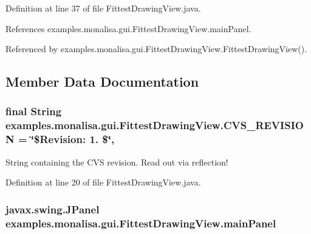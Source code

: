 Definition at line 37 of file Fittest\-Drawing\-View.\-java.



References examples.\-monalisa.\-gui.\-Fittest\-Drawing\-View.\-main\-Panel.



Referenced by examples.\-monalisa.\-gui.\-Fittest\-Drawing\-View.\-Fittest\-Drawing\-View().



\subsection{Member Data Documentation}
\hypertarget{classexamples_1_1monalisa_1_1gui_1_1_fittest_drawing_view_a9478a66d2827066e7842b68d10d8c9cf}{
\subsubsection[{C\-V\-S\-\_\-\-R\-E\-V\-I\-S\-I\-O\-N}]{\setlength{\rightskip}{0pt plus 5cm}final String examples.\-monalisa.\-gui.\-Fittest\-Drawing\-View.\-C\-V\-S\-\_\-\-R\-E\-V\-I\-S\-I\-O\-N = \char`\"{}\$Revision\-: 1. \$\char`\"{}\hspace{0.3cm}{\ttfamily [static]}, {\ttfamily [private]}}}\label{classexamples_1_1monalisa_1_1gui_1_1_fittest_drawing_view_a9478a66d2827066e7842b68d10d8c9cf}
String containing the C\-V\-S revision. Read out via reflection! 

Definition at line 20 of file Fittest\-Drawing\-View.\-java.

\hypertarget{classexamples_1_1monalisa_1_1gui_1_1_fittest_drawing_view_aa37abc4e4fa6e42b0554dbfac39b02e9}{
\subsubsection[{main\-Panel}]{\setlength{\rightskip}{0pt plus 5cm}javax.\-swing.\-J\-Panel examples.\-monalisa.\-gui.\-Fittest\-Drawing\-View.\-main\-Panel\hspace{0.3cm}{\ttfamily [private]}}}\label{classexamples_1_1monalisa_1_1gui_1_1_fittest_drawing_view_aa37abc4e4fa6e42b0554dbfac39b02e9}


